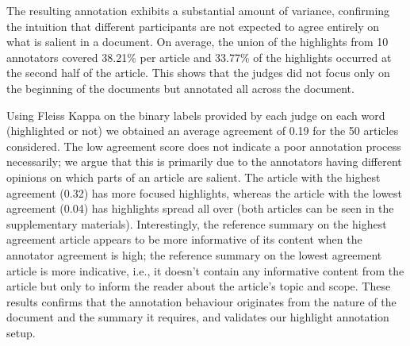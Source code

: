\documentclass[11pt,a4paper]{article}
\newcommand\xsum{\textsc{XSum}}
\begin{document}


The resulting annotation exhibits a substantial amount of variance, confirming the intuition that different participants are not expected to agree entirely on what is salient in a document. 
On average, the union of the highlights from 10 annotators covered 38.21\% per article and  33.77\% of the highlights occurred at the second half of the article. This shows that the judges did not focus only on the beginning of the documents but annotated all across the document.


Using Fleiss Kappa \citep{Josep1971} on the binary labels provided by each judge on each word (highlighted or not) we obtained an average agreement of 0.19 for the 50 articles considered. The low agreement score does not indicate a poor annotation process necessarily; we argue that this is primarily due to the annotators having different opinions on which parts of an article are salient. The article with the highest agreement (0.32) has more focused highlights, whereas the article with the lowest agreement (0.04) has highlights spread all over (both articles can be seen in the supplementary materials). Interestingly, the reference summary on the highest agreement article appears to be more informative of its content when the annotator agreement is high; the reference summary on the lowest agreement article is more indicative, i.e., it doesn’t contain any informative content from the article but only to inform the reader about the article’s topic and scope. These results confirms that the annotation behaviour originates from the nature of the document and the summary it requires, and validates our highlight annotation setup.
\end{document}
